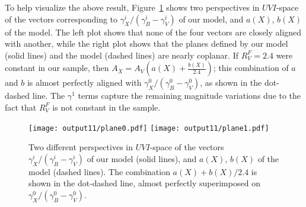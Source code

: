 \documentclass{aastex61}   	%
\begin{document}
\color{red}
To help visualize the above result, Figure~\ref{plane:fig} shows two perspectives in $UVI$-space
of the vectors corresponding to $\gamma^i_X/(\gamma^i_B-\gamma^i_V)$ of our model,
and $a(X)$, $b(X)$ of the  model.
The left plot shows that none of the four vectors are closely aligned with another, while the right plot shows that
the planes defined by our model (solid lines) and the   model (dashed lines) are nearly coplanar.
If $R^F_V=2.4$ were constant in our sample, then $A_X = A_V\left(a(X) + \frac{b(X)}{2.4}\right)$;  this combination of $a$ and $b$ is
almost perfectly aligned with $\gamma^0_X/(\gamma^0_B-\gamma^0_V)$, as shown in the dot-dashed line.  
The $\gamma^1$ terms capture the remaining magnitude variations due to the fact that $R^F_V$ is not constant in the sample.

\begin{figure}[htbp] %
   \centering
   \texttt{[image: output11/plane0.pdf]}
   \texttt{[image: output11/plane1.pdf]}
   \caption{
   \color{red}
   Two different perspectives in $UVI$-space of the vectors $\gamma^i_X/(\gamma^i_B-\gamma^i_V)$ of our model (solid lines),
   and $a(X)$, $b(X)$ of the  model (dashed lines).  The combination $a(X)+b(X)/2.4$ is shown in the dot-dashed
   line, almost perfectly superimposed on $\gamma^0_X/(\gamma^0_B-\gamma^0_V)$.
   \color{black}
   \label{plane:fig}}
\end{figure}

\color{black}

%
%
%
\end{document}
